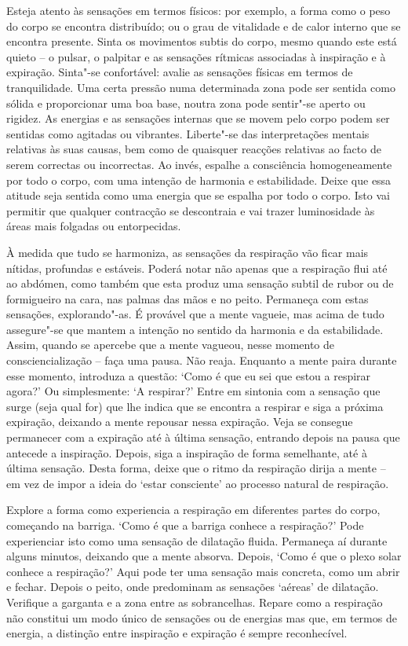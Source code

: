 Esteja atento às sensações em termos físicos: por exemplo, a forma como o peso
do corpo se encontra distribuído; ou o grau de vitalidade e de calor interno que
se encontra presente. Sinta os movimentos subtis do corpo, mesmo quando este
está quieto -- o pulsar, o palpitar e as sensações rítmicas associadas à
inspiração e à expiração. Sinta"-se confortável: avalie as sensações físicas em
termos de tranquilidade. Uma certa pressão numa determinada zona pode ser
sentida como sólida e proporcionar uma boa base, noutra zona pode sentir"-se
aperto ou rigidez. As energias e as sensações internas que se movem pelo corpo
podem ser sentidas como agitadas ou vibrantes. Liberte"-se das interpretações
mentais relativas às suas causas, bem como de quaisquer reacções relativas ao
facto de serem correctas ou incorrectas. Ao invés, espalhe a consciência
homogeneamente por todo o corpo, com uma intenção de harmonia e estabilidade.
Deixe que essa atitude seja sentida como uma energia que se espalha por todo o
corpo. Isto vai permitir que qualquer contracção se descontraia e vai trazer
luminosidade às áreas mais folgadas ou entorpecidas.

\enlargethispage{\baselineskip}

À medida que tudo se harmoniza, as sensações da respiração vão ficar mais
nítidas, profundas e estáveis. Poderá notar não apenas que a respiração flui até
ao abdómen, como também que esta produz uma sensação subtil de rubor ou de
formigueiro na cara, nas palmas das mãos e no peito. Permaneça com estas
sensações, explorando"-as. É provável que a mente vagueie, mas acima de tudo
assegure"-se que mantem a intenção no sentido da harmonia e da estabilidade.
Assim, quando se apercebe que a mente vagueou, nesse momento de
consciencialização -- faça uma pausa. Não reaja. Enquanto a mente paira durante
esse momento, introduza a questão: `Como é que eu sei que estou a respirar
agora?' Ou simplesmente: `A respirar?' Entre em sintonia com a sensação que
surge (seja qual for) que lhe indica que se encontra a respirar e siga a próxima
expiração, deixando a mente repousar nessa expiração. Veja se consegue
permanecer com a expiração até à última sensação, entrando depois na pausa que
antecede a inspiração. Depois, siga a inspiração de forma semelhante, até à
última sensação. Desta forma, deixe que o ritmo da respiração dirija a mente --
em vez de impor a ideia do `estar consciente' ao processo natural de respiração.

Explore a forma como experiencia a respiração em diferentes partes do corpo,
começando na barriga. `Como é que a barriga conhece a respiração?' Pode
experienciar isto como uma sensação de dilatação fluida. Permaneça aí durante
alguns minutos, deixando que a mente absorva. Depois, `Como é que o plexo solar
conhece a respiração?' Aqui pode ter uma sensação mais concreta, como um abrir e
fechar. Depois o peito, onde predominam as sensações `aéreas' de dilatação.
Verifique a garganta e a zona entre as sobrancelhas. Repare como a respiração
não constitui um modo único de sensações ou de energias mas que, em termos de
energia, a distinção entre inspiração e expiração é sempre reconhecível.

